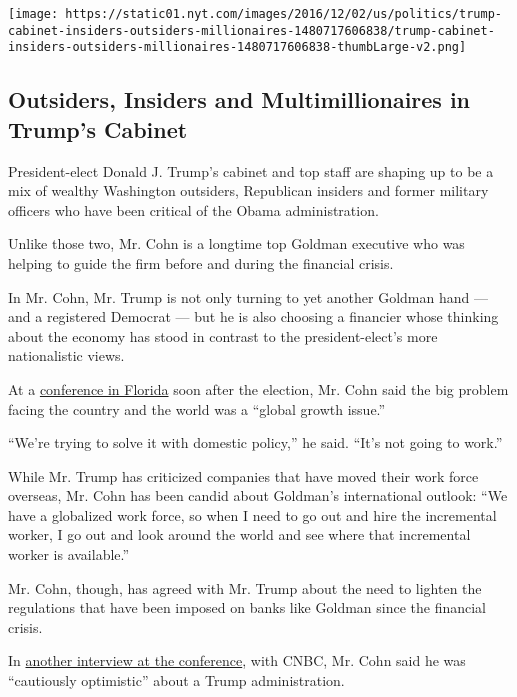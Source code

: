 \href{https://www.nytimes.com/interactive/2016/12/05/us/politics/trump-cabinet-insiders-outsiders-millionaires.html}{}

\texttt{[image: https://static01.nyt.com/images/2016/12/02/us/politics/trump-cabinet-insiders-outsiders-millionaires-1480717606838/trump-cabinet-insiders-outsiders-millionaires-1480717606838-thumbLarge-v2.png]}

\hypertarget{outsiders-insiders-and-multimillionaires-in-trumps-cabinet}{%
\subsection{Outsiders, Insiders and Multimillionaires in Trump's
Cabinet}\label{outsiders-insiders-and-multimillionaires-in-trumps-cabinet}}

President-elect Donald J. Trump's cabinet and top staff are shaping up
to be a mix of wealthy Washington outsiders, Republican insiders and
former military officers who have been critical of the Obama
administration.

Unlike those two, Mr. Cohn is a longtime top Goldman executive who was
helping to guide the firm before and during the financial crisis.

In Mr. Cohn, Mr. Trump is not only turning to yet another Goldman hand
--- and a registered Democrat --- but he is also choosing a financier
whose thinking about the economy has stood in contrast to the
president-elect's more nationalistic views.

At a
\href{http://openmarkets.cmegroup.com/11728/goldman-sachs-cohn-market-looking-predictability}{conference
in Florida} soon after the election, Mr. Cohn said the big problem
facing the country and the world was a ``global growth issue.''

``We're trying to solve it with domestic policy,'' he said. ``It's not
going to work.''

While Mr. Trump has criticized companies that have moved their work
force overseas, Mr. Cohn has been candid about Goldman's international
outlook: ``We have a globalized work force, so when I need to go out and
hire the incremental worker, I go out and look around the world and see
where that incremental worker is available.''

Mr. Cohn, though, has agreed with Mr. Trump about the need to lighten
the regulations that have been imposed on banks like Goldman since the
financial crisis.

In
\href{http://video.cnbc.com/gallery/?video=3000568273\&play=1}{another
interview at the conference}, with CNBC, Mr. Cohn said he was
``cautiously optimistic'' about a Trump administration.

